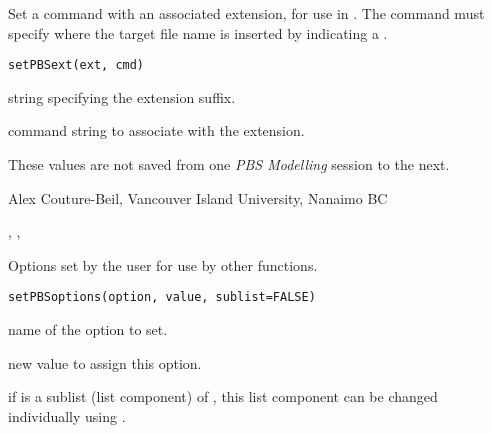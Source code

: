\documentclass[letterpaper]{book}
\begin{document}
%
\begin{Description}\relax
Set a command with an associated extension, for use in 
.  The command must specify where the target file 
name is inserted by indicating a .
\end{Description}
%
\begin{Usage}
\begin{verbatim}
setPBSext(ext, cmd)
\end{verbatim}
\end{Usage}
%
\begin{Arguments}
\begin{ldescription}
\item[\code{ext}] string specifying the extension suffix.
\item[\code{cmd}] command string to associate with the extension.
\end{ldescription}
\end{Arguments}
%
\begin{Note}\relax
These values are not saved from one \emph{PBS Modelling} session to the next.
\end{Note}
%
\begin{Author}\relax
Alex Couture-Beil, Vancouver Island University, Nanaimo BC
\end{Author}
%
\begin{SeeAlso}\relax
{}, , 
\end{SeeAlso}
%
\begin{Description}\relax
Options set by the user for use by other functions.
\end{Description}
%
\begin{Usage}
\begin{verbatim}
setPBSoptions(option, value, sublist=FALSE)
\end{verbatim}
\end{Usage}
%
\begin{Arguments}
\begin{ldescription}
\item[\code{option}] name of the option to set.
\item[\code{value}] new value to assign this option.
\item[\code{sublist}] if  is a sublist (list component) of ,
this list component can be changed individually using .
\end{ldescription}
\end{Arguments}
\end{document}
